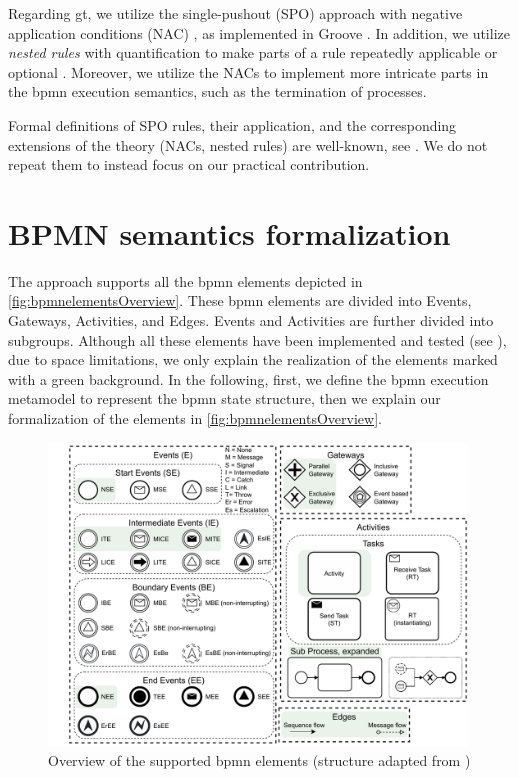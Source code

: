 \documentclass[runningheads]{lmcs}
\begin{document}
Regarding \gls*{gt}, we utilize the single-pushout (SPO) approach with negative application conditions (NAC) \cite{ehrigALGEBRAICAPPROACHESGRAPH1997}, as implemented in Groove \cite{rensinkGROOVESimulatorTool2004}.
In addition, we utilize \textit{nested rules} with quantification to make parts of a rule repeatedly applicable or optional \cite{rensinkNestedQuantificationGraph2006,rensinkHowMuchAre2017}.
Moreover, we utilize the NACs to implement more intricate parts in the \gls*{bpmn} execution semantics, such as the termination of processes.

Formal definitions of SPO rules, their application, and the corresponding extensions of the theory (NACs, nested rules) are well-known, see \cite{ehrigALGEBRAICAPPROACHESGRAPH1997,rensinkNestedQuantificationGraph2006}.
We do not repeat them to instead focus on our practical contribution.


\section{BPMN semantics formalization} \label{sec:formalization}

The approach supports all the \gls*{bpmn} elements depicted in \autoref{fig:bpmnelementsOverview}.
These \gls*{bpmn} elements are divided into \textsf{Events}, \textsf{Gateways}, \textsf{Activities}, and \textsf{Edges}.
\textsf{Events} and \textsf{Activities} are further divided into subgroups.
Although all these elements have been implemented and tested (see \cite{krauterArtifactsICGT2023}), due to space limitations, we only explain the realization of the elements marked with a green background.
In the following, first, we define the \gls*{bpmn} execution metamodel to represent the \gls*{bpmn} state structure, then we explain our formalization of the elements in \autoref{fig:bpmnelementsOverview}.


\begin{figure}[ht]
    \centering
    \includegraphics[width=0.99\textwidth]{images/bpmn_semantics-elements-overview.pdf}
    \caption{Overview of the supported \gls*{bpmn} elements (structure adapted from \cite{houhouFirstOrderLogicVerification2022})}
    \label{fig:bpmnelementsOverview}
\end{figure}
\end{document}
